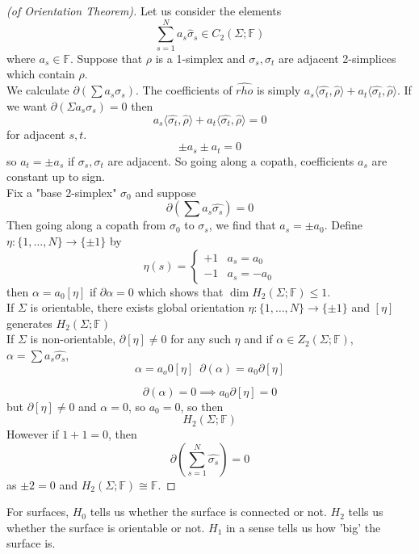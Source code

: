 \documentclass[a4paper,14pt]{extarticle}
\theoremstyle{definition}
\begin{document}
\begin{proof}[(of Orientation Theorem)]
Let us consider the elements 
\[\sum_{s=1}^N a_s\hat{\sigma}_s\in C_2(\Sigma;\mathbb{F})\] where $a_s\in\mathbb{F}$.
Suppose that $\rho$ is a 1-simplex and $\sigma_s,\sigma_t$ are adjacent 2-simplices which contain $\rho$. \\

We calculate $\partial(\sum a_s\sigma_s)$. The coefficients of $\hat{rho}$ is simply 
$a_s\langle\hat{\sigma_t},\hat{\rho}\rangle + a_t\langle\hat{\sigma_t},\hat{\rho}\rangle$.
If we want $\partial(\Sigma a_s\sigma_s)=0$ then 
\[a_s\langle\hat{\sigma_t},\hat{\rho}\rangle + a_t\langle\hat{\sigma_t},\hat{\rho}\rangle=0\]
for adjacent $s,t$. \[\pm a_s\pm a_t=0\] so $a_t=\pm a_s$ if $\sigma_s,\sigma_t$ are adjacent.
So going along a copath, coefficients $a_s$ are constant up to sign. \\

Fix a "base 2-simplex" $\sigma_0$ and suppose \[\partial(\sum a_s\hat{\sigma_s})=0\] Then 
going along a copath from $\sigma_0$ to $\sigma_s$, we find that $a_s=\pm a_0$. Define 
$\eta:\{1,\ldots,N\}\rightarrow\{\pm1\}$ by 
\[\eta(s)=\begin{cases}
	+1& a_s=a_0 \\ -1& a_s=-a_0
\end{cases}\]
then $\alpha=a_0[\eta]$ if $\partial\alpha=0$ which shows that $\dim H_2(\Sigma;\mathbb{F})\leq1$. \\

If $\Sigma $ is orientable, there exists global orientation $\eta:\{1,\ldots,N\}\rightarrow
\{\pm 1\}$ and $[\eta]$ generates $H_2(\Sigma;\mathbb{F})$ \\

If $\Sigma$ is non-orientable, $\partial[\eta]\neq0$ for any such $\eta$ and if 
$\alpha\in Z_2(\Sigma;\mathbb{F})$, $\alpha=\sum a_s\hat{\sigma_s}$, \[\alpha=a_o0[\eta]
\,\,\,\partial(\alpha)=a_0\partial[\eta]\]

\[\partial(\alpha)=0\implies a_0\partial[\eta]=0\] but $\partial[\eta]\neq0$ and $\alpha=0$,
so $a_0=0$, so then \[H_2(\Sigma;\mathbb{F})\] However if $1+1=0$, then 
\[\partial(\sum_{s=1}^N \hat{\sigma_s})=0\] as $\pm 2=0$ and $H_2(\Sigma;\mathbb{F})\cong
\mathbb{F}$.
\end{proof}

For surfaces, $H_0$ tells us whether the surface is connected or not. $H_2$ tells us
whether the surface is orientable or not. $H_1$ in a sense tells us how 'big' the surface is.

\newpage
\end{document}
